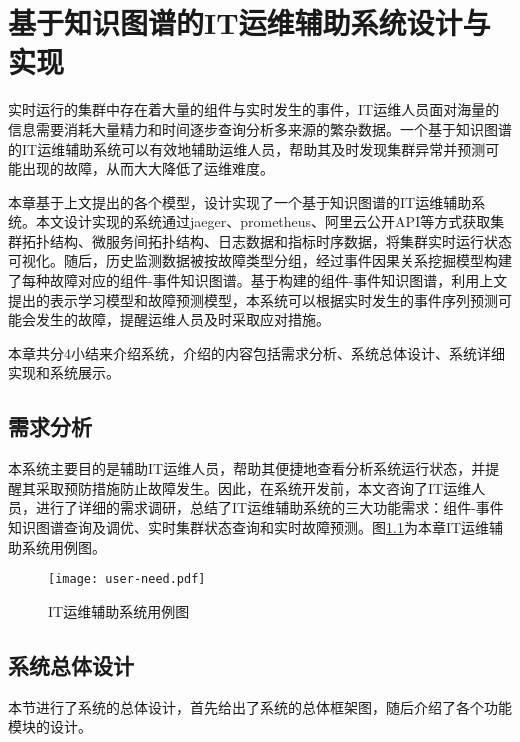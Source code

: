 \chapter{基于知识图谱的IT运维辅助系统设计与实现}
实时运行的集群中存在着大量的组件与实时发生的事件，IT运维人员面对海量的信息需要消耗大量精力和时间逐步查询分析多来源的繁杂数据。一个基于知识图谱的IT运维辅助系统可以有效地辅助运维人员，帮助其及时发现集群异常并预测可能出现的故障，从而大大降低了运维难度。

本章基于上文提出的各个模型，设计实现了一个基于知识图谱的IT运维辅助系统。本文设计实现的系统通过jaeger\cite{mengistu2020distributed}、prometheus\cite{padgham2002prometheus}、阿里云公开API等方式获取集群拓扑结构、微服务间拓扑结构、日志数据和指标时序数据，将集群实时运行状态可视化。随后，历史监测数据被按故障类型分组，经过事件因果关系挖掘模型构建了每种故障对应的组件-事件知识图谱。基于构建的组件-事件知识图谱，利用上文提出的表示学习模型和故障预测模型，本系统可以根据实时发生的事件序列预测可能会发生的故障，提醒运维人员及时采取应对措施。

本章共分4小结来介绍系统，介绍的内容包括需求分析、系统总体设计、系统详细实现和系统展示。
\section{需求分析}
本系统主要目的是辅助IT运维人员，帮助其便捷地查看分析系统运行状态，并提醒其采取预防措施防止故障发生。因此，在系统开发前，本文咨询了IT运维人员，进行了详细的需求调研，总结了IT运维辅助系统的三大功能需求：组件-事件知识图谱查询及调优、实时集群状态查询和实时故障预测。图\ref{user-need}为本章IT运维辅助系统用例图。
\begin{figure}[htbp]
    \centering
    \texttt{[image: user-need.pdf]}
    \caption{IT运维辅助系统用例图\label{user-need}}
\end{figure}
\section{系统总体设计}
本节进行了系统的总体设计，首先给出了系统的总体框架图，随后介绍了各个功能模块的设计。
